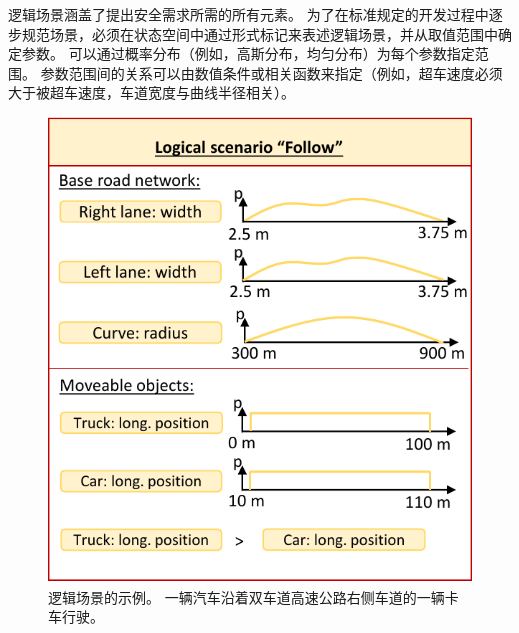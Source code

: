 逻辑场景涵盖了提出安全需求所需的所有元素。
为了在标准规定的开发过程中逐步规范场景，必须在状态空间中通过形式标记来表述逻辑场景，并从取值范围中确定参数。
可以通过概率分布（例如，高斯分布，均匀分布）为每个参数指定范围。
参数范围间的关系可以由数值条件或相关函数来指定（例如，超车速度必须大于被超车速度，车道宽度与曲线半径相关）。

\begin{figure}
	\centering
	\includegraphics[width=0.9\columnwidth]{./4_terminology/graphics/logicalScenario.pdf}
	\caption{逻辑场景的示例。 一辆汽车沿着双车道高速公路右侧车道的一辆卡车行驶。}
	\label{fig:logicalScenario}
\end{figure}

